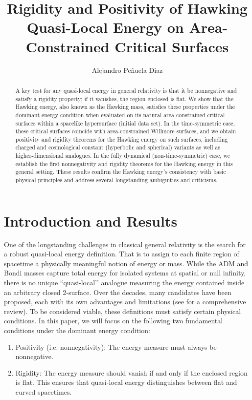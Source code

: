 \documentclass[12pt,a4paper]{amsart}
\title[]{Rigidity and Positivity of Hawking Quasi-Local Energy on Area-Constrained Critical Surfaces}
\author[Pe\~nuela Diaz]{Alejandro Pe\~nuela Diaz}
\theoremstyle{plain}
\theoremstyle{definition}
\begin{document}
\begin{abstract}
 A key test for any quasi-local energy in general relativity is that it be nonnegative and satisfy a rigidity property; if it vanishes, the region enclosed is flat.  We show that the Hawking energy, also known as the Hawking mass, satisfies these properties under the dominant energy condition when evaluated on its natural area-constrained critical surfaces within a spacelike hypersurface (initial data set).  In the time-symmetric case, these critical surfaces coincide with area-constrained Willmore surfaces, and we obtain positivity and rigidity theorems for the Hawking energy on such surfaces, including charged and   cosmological constant (hyperbolic and spherical) variants as well as higher-dimensional analogues. In the fully dynamical (non-time-symmetric) case, we establish the first nonnegativity and rigidity theorems for the Hawking energy in this general setting. These results confirm the Hawking energy's consistency with basic physical principles and address several longstanding ambiguities and criticisms.
\end{abstract}
\maketitle


\section{Introduction and Results}
One of the longstanding challenges in classical general relativity is the search for a robust quasi-local energy definition. That is to assign to each finite region of spacetime a physically meaningful notion of energy or mass. While the ADM and Bondi masses capture total energy for isolated systems at spatial or null infinity, there is no unique ``quasi-local’’ analogue measuring the energy contained inside an arbitrary closed 2-surface. Over the decades, many candidates have been proposed, each with its own advantages and limitations (see \cite{Living} for a comprehensive review).  To be considered viable, these definitions must satisfy certain physical conditions. In this paper, we will focus on the following two fundamental conditions under the dominant energy condition:

\begin{enumerate}
    \item  Positivity (i.e. nonnegativity): The energy measure must always be nonnegative.

     \item Rigidity: The energy measure should vanish if and only if the enclosed region is flat. This ensures that quasi-local energy distinguishes between flat and curved spacetimes. 
\end{enumerate}
\end{document}
